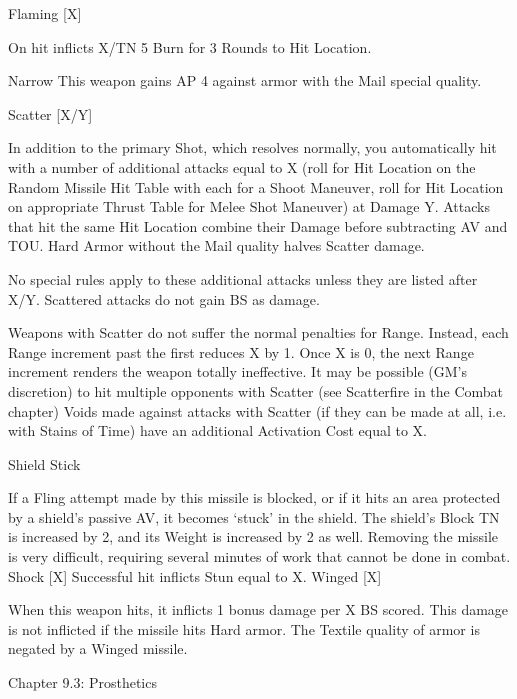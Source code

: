 \documentclass[oneside,11pt,english]{book}
\begin{document}
Flaming 
[X] 

On hit inflicts X/TN 5 Burn for 3 Rounds to Hit Location. 

Narrow This weapon gains AP 4 against armor with the Mail special quality. 


Scatter 
[X/Y] 

In addition to the primary Shot, which resolves normally, you automatically hit with a number of 
additional attacks equal to X (roll for Hit Location on the Random Missile Hit Table with each for a 
Shoot Maneuver, roll for Hit Location on appropriate Thrust Table for Melee Shot Maneuver) at 
Damage Y. Attacks that hit the same Hit Location combine their Damage before subtracting AV and 
TOU. 
Hard Armor without the Mail quality halves Scatter damage. 

 

 No special rules apply to these additional attacks unless they are listed after X/Y. Scattered attacks do 
not gain BS as damage. 

 

Weapons with Scatter do not suffer the normal penalties for Range. Instead, each Range increment 
past the first reduces X by 1. Once X is 0, the next Range increment renders the weapon totally 
ineffective. It may be possible (GM’s discretion) to hit multiple opponents with Scatter (see 
Scatterfire in the Combat chapter) 
Voids made against attacks with Scatter (if they can be made at all, i.e. with Stains of Time) have an 
additional Activation Cost equal to X. 

Shield 
Stick 

If a Fling attempt made by this missile is blocked, or if it hits an area protected by a shield’s passive 
AV, it becomes ‘stuck’ in the shield. The shield’s Block TN is increased by 2, and its Weight is 
increased by 2 as well. Removing the missile is very difficult, requiring several minutes of work that 
cannot be done in combat. 
Shock [X] Successful hit inflicts Stun equal to X. 
Winged 
[X] 

When this weapon hits, it inflicts 1 bonus damage per X BS scored. This damage is not inflicted if the 
missile hits Hard armor. The Textile quality of armor is negated by a Winged missile. 

 

Chapter 9.3: Prosthetics 

 
\end{document}
